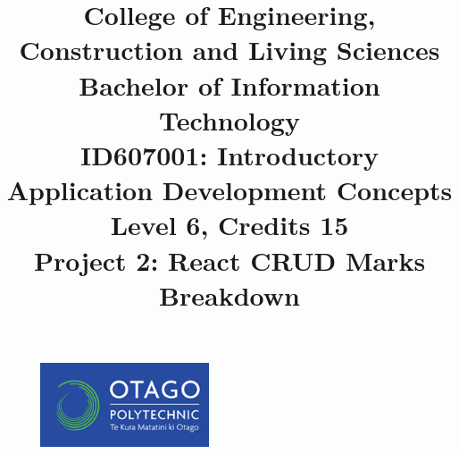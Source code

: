 \documentclass{article}
\author{}
\begin{document}
\begin{figure}
  \centering
  \includegraphics[width=50mm]{../img/logo.png}
\end{figure}

\title{College of Engineering, Construction and Living Sciences\\Bachelor of Information Technology\\ID607001: Introductory Application Development Concepts\\Level 6, Credits 15\\\textbf{Project 2: React CRUD Marks Breakdown}}
\date{}
\maketitle
\end{document}
